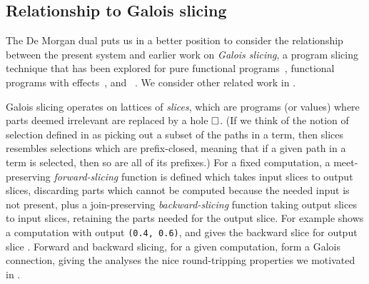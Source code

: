 \subsection{Relationship to Galois slicing}
\label{sec:de-morgan:galois-slicing}



The De Morgan dual puts us in a better position to consider the relationship between the present system and earlier work on \emph{Galois slicing}, a program slicing technique that has been explored for pure functional programs~\cite{perera12a}, functional programs with effects~\cite{ricciotti17}, and \piCalculus~\cite{perera16d}. We consider other related work in .

Galois slicing operates on lattices of \emph{slices}, which are programs (or values) where parts deemed irrelevant are replaced by a hole $\square$. (If we think of the notion of selection defined in  as picking out a subset of the paths in a term, then slices resembles selections which are prefix-closed, meaning that if a given path in a term is selected, then so are all of its prefixes.) For a fixed computation, a meet-preserving \emph{forward-slicing} function is defined which takes input slices to output slices, discarding parts which cannot be computed because the needed input is not present, plus a join-preserving \emph{backward-slicing} function taking output slices to input slices, retaining the parts needed for the output slice. For example  shows a computation with output \lstinline{(0.4, 0.6)}, and  gives the backward slice for output slice . Forward and backward slicing, for a given computation, form a Galois connection, giving the analyses the nice round-tripping properties we motivated in .

